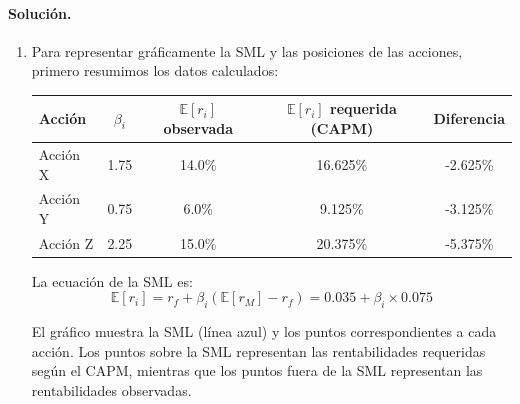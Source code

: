 \documentclass[12pt,a4paper]{article}
\newcommand{\E}{\mathbb{E}}
\newenvironment{solucion}{\paragraph{Solución.}}{}
\begin{document}
\begin{solucion}
\begin{enumerate}[label=\alph*)]
  \item Para representar gráficamente la SML y las posiciones de las acciones, primero resumimos los datos calculados:
  
  \begin{center}
  \begin{tabular}{lcccc}
  \toprule
  Acción & $\beta_i$ & $\E[r_i]$ observada & $\E[r_i]$ requerida (CAPM) & Diferencia \\
  \midrule
  Acción X & 1.75 & 14.0\% & 16.625\% & -2.625\% \\
  Acción Y & 0.75 & 6.0\% & 9.125\% & -3.125\% \\
  Acción Z & 2.25 & 15.0\% & 20.375\% & -5.375\% \\
  \bottomrule
  \end{tabular}
  \end{center}
  
  La ecuación de la SML es:
  \[
  \E[r_i] = r_f + \beta_i (\E[r_M] - r_f) = 0.035 + \beta_i \times 0.075
  \]
  
  El gráfico muestra la SML (línea azul) y los puntos correspondientes a cada acción. Los puntos sobre la SML representan las rentabilidades requeridas según el CAPM, mientras que los puntos fuera de la SML representan las rentabilidades observadas.
  
  \begin{center}
  \shorthandoff{<>}
\end{center}
\end{enumerate}
\end{solucion}
\end{document}
